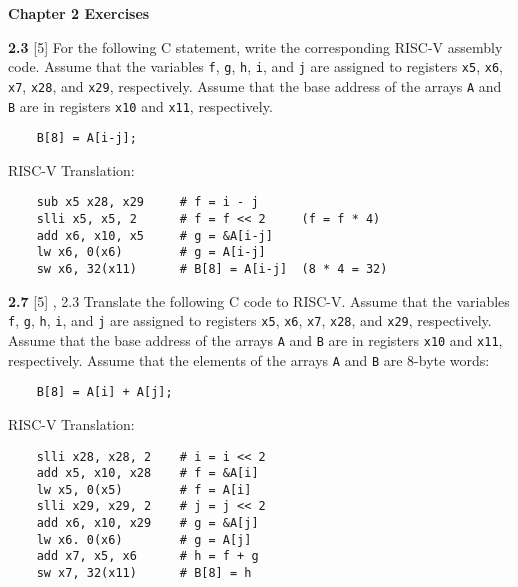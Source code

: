 \documentclass[fleqn]{article}
\begin{document}
\pagestyle{fancy}
\fancyhead{}
\fancyhead[R]{\thepage}
\fancyfoot{}

\begin{center}
    \Large{\textbf{Chapter 2 Exercises}}\\
\end{center}
\vspace{0.25in}

\textbf{2.3} [5] \textrangle \; For the following C statement, write the corresponding RISC-V assembly code. Assume that the variables \verb|f|, \verb|g|, \verb|h|, \verb|i|, and \verb|j| are assigned to registers \verb|x5|, \verb|x6|, \verb|x7|, \verb|x28|, and \verb|x29|, respectively. Assume that the base address of the arrays \verb|A| and \verb|B| are in registers \verb|x10| and \verb|x11|, respectively.

\begin{verbatim}
    B[8] = A[i-j];
\end{verbatim}

RISC-V Translation:
\begin{lstlisting}
    sub x5 x28, x29     # f = i - j
    slli x5, x5, 2      # f = f << 2     (f = f * 4) 
    add x6, x10, x5     # g = &A[i-j]
    lw x6, 0(x6)        # g = A[i-j]
    sw x6, 32(x11)      # B[8] = A[i-j]  (8 * 4 = 32)
\end{lstlisting}

\vspace{0.5in}

\textbf{2.7} [5] , 2.3\textrangle \; Translate the following C code to RISC-V. Assume that the variables \verb|f|, \verb|g|, \verb|h|, \verb|i|, and \verb|j| are assigned to registers \verb|x5|, \verb|x6|, \verb|x7|, \verb|x28|, and \verb|x29|, respectively. Assume that the base address of the arrays \verb|A| and \verb|B| are in registers \verb|x10| and \verb|x11|, respectively. Assume that the elements of the arrays \verb|A| and \verb|B| are 8-byte words:
\begin{verbatim}
    B[8] = A[i] + A[j];
\end{verbatim}

RISC-V Translation:
\begin{lstlisting}
    slli x28, x28, 2    # i = i << 2
    add x5, x10, x28    # f = &A[i]
    lw x5, 0(x5)        # f = A[i]
    slli x29, x29, 2    # j = j << 2
    add x6, x10, x29    # g = &A[j]
    lw x6. 0(x6)        # g = A[j]
    add x7, x5, x6      # h = f + g
    sw x7, 32(x11)      # B[8] = h
\end{lstlisting}
\end{document}

